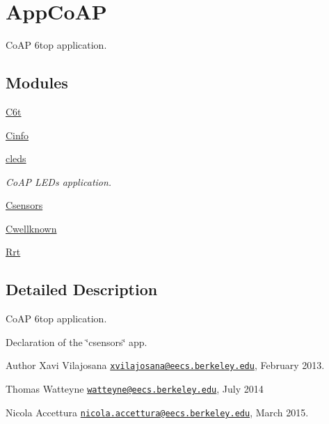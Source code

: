 \hypertarget{group___app_co_a_p}{}\section{App\+Co\+AP}
\label{group___app_co_a_p}


Co\+AP 6top application.  


\subsection*{Modules}
\begin{DoxyCompactItemize}
\item 
\hyperlink{group__c6t}{C6t}
\item 
\hyperlink{group__cinfo}{Cinfo}
\item 
\hyperlink{group__cleds}{cleds}
\begin{DoxyCompactList}\small\item\em Co\+AP L\+E\+Ds application. \end{DoxyCompactList}\item 
\hyperlink{group__csensors}{Csensors}
\item 
\hyperlink{group__cwellknown}{Cwellknown}
\item 
\hyperlink{group__rrt}{Rrt}
\end{DoxyCompactItemize}


\subsection{Detailed Description}
Co\+AP 6top application. 

Declaration of the \char`\"{}csensors\char`\"{} app.

\begin{DoxyAuthor}{Author}
Xavi Vilajosana \href{mailto:xvilajosana@eecs.berkeley.edu}{\tt xvilajosana@eecs.\+berkeley.\+edu}, February 2013. 

Thomas Watteyne \href{mailto:watteyne@eecs.berkeley.edu}{\tt watteyne@eecs.\+berkeley.\+edu}, July 2014

Nicola Accettura \href{mailto:nicola.accettura@eecs.berkeley.edu}{\tt nicola.\+accettura@eecs.\+berkeley.\+edu}, March 2015. 
\end{DoxyAuthor}
